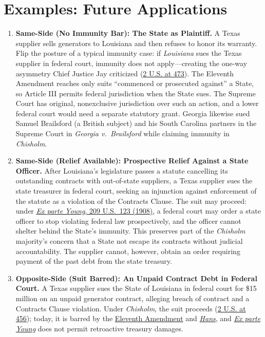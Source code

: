 \documentclass[12pt]{article}
\begin{document}
\section{Examples: Future Applications}
\begin{enumerate}

\item \textbf{Same-Side (No Immunity Bar): The State as Plaintiff.} A Texas supplier sells generators to Louisiana and then refuses to honor its warranty. Flip the posture of a typical immunity case: if \emph{Louisiana} sues the Texas supplier in federal court, immunity does not apply---creating the one-way asymmetry Chief Justice Jay criticized (\href{https://supreme.justia.com/cases/federal/us/2/419/}{2 U.S. at 473}). The Eleventh Amendment reaches only suits ``commenced or prosecuted against'' a State, so Article III permits federal jurisdiction when the State sues. The Supreme Court has original, nonexclusive jurisdiction over such an action, and a lower federal court would need a separate statutory grant. Georgia likewise sued Samuel Brailsford (a British subject) and his South Carolina partners in the Supreme Court in \emph{Georgia v.\ Brailsford} while claiming immunity in \emph{Chisholm}.

\item \textbf{Same-Side (Relief Available): Prospective Relief Against a State Officer.} After Louisiana's legislature passes a statute cancelling its outstanding contracts with out-of-state suppliers, a Texas supplier sues the state treasurer in federal court, seeking an injunction against enforcement of the statute as a violation of the Contracts Clause. The suit may proceed: under \href{https://supreme.justia.com/cases/federal/us/209/123/}{\emph{Ex parte Young}, 209 U.S.\ 123 (1908)}, a federal court may order a state officer to stop violating federal law prospectively, and the officer cannot shelter behind the State's immunity. This preserves part of the \emph{Chisholm} majority's concern that a State not escape its contracts without judicial accountability. The supplier cannot, however, obtain an order requiring payment of the past debt from the state treasury.

\item \textbf{Opposite-Side (Suit Barred): An Unpaid Contract Debt in Federal Court.} A Texas supplier sues the State of Louisiana in federal court for \$15 million on an unpaid generator contract, alleging breach of contract and a Contracts Clause violation. Under \emph{Chisholm}, the suit proceeds (\href{https://supreme.justia.com/cases/federal/us/2/419/}{2 U.S. at 456}); today, it is barred by the \href{https://www.law.cornell.edu/constitution-conan/amendment-11/historical-background-on-eleventh-amendment}{Eleventh Amendment} and \href{https://supreme.justia.com/cases/federal/us/134/1/}{\emph{Hans}}, and \href{https://supreme.justia.com/cases/federal/us/209/123/}{\emph{Ex parte Young}} does not permit retroactive treasury damages.


\end{enumerate}
\end{document}
